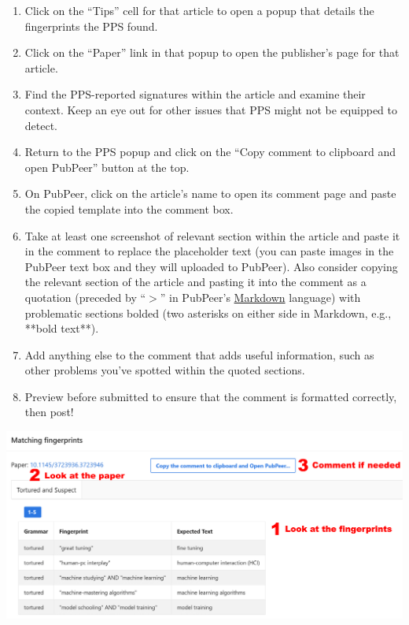 \documentclass[letterpaper, 12pt]{article}
\begin{document}
\begin{enumerate}
    \setlength\itemsep{-0.5em}
    \item Click on the ``Tips'' cell for that article to open a popup that details the fingerprints the PPS found.
    \item Click on the ``Paper'' link in that popup to open the publisher's page for that article.
    \item Find the PPS-reported signatures within the article and examine their context. Keep an eye out for other issues that PPS might not be equipped to detect.
    \item Return to the PPS popup and click on the ``Copy comment to clipboard and open PubPeer'' button at the top.
    \item On PubPeer, click on the article's name to open its comment page and paste the copied template into the comment box.
    \item Take at least one screenshot of relevant section within the article and paste it in the comment to replace the placeholder text (you can paste images in the PubPeer text box and they will uploaded to PubPeer). Also consider copying the relevant section of the article and pasting it into the comment as a quotation (preceded by ``$>$'' in PubPeer's \href{https://pubpeer.com/static/markdown}{Markdown} language) with problematic sections bolded (two asterisks on either side in Markdown, e.g., **bold text**).
    \item Add anything else to the comment that adds useful information, such as other problems you've spotted within the quoted sections.
    \item Preview before submitted to ensure that the comment is formatted correctly, then post!
\end{enumerate}

\includegraphics[width=\linewidth]{img/getting_started/Process.png}
\end{document}
